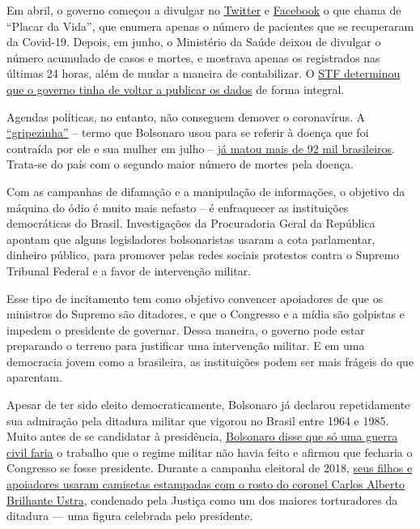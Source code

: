 Em abril, o governo começou a divulgar no
\href{https://twitter.com/secomvc/status/1257836970518200323}{Twitter} e
\href{https://www.facebook.com/minsaude/posts/3549590468392877}{Facebook}
o que chama de ``Placar da Vida'', que enumera apenas o número de
pacientes que se recuperaram da Covid-19. Depois, em junho, o Ministério
da Saúde deixou de divulgar o número acumulado de casos e mortes, e
mostrava apenas os registrados nas últimas 24 horas, além de mudar a
maneira de contabilizar. O
\href{https://www.nytimes.com/2020/06/19/world/coronavirus-live-updates.html}{STF
determinou que o governo tinha de voltar a publicar os dados} de forma
integral.

Agendas políticas, no entanto, não conseguem demover o coronavírus. A
\href{https://www.cnn.com/2020/05/23/americas/brazil-coronavirus-hospitals-intl/index.html}{``gripezinha''}
-- termo que Bolsonaro usou para se referir à doença que foi contraída
por ele e sua mulher em julho --
\href{https://www.nytimes.com/interactive/2020/world/americas/brazil-coronavirus-cases.html}{já
matou mais de 92 mil brasileiros}. Trata-se do país com o segundo maior
número de mortes pela doença.

Com as campanhas de difamação e a manipulação de informações, o objetivo
da máquina do ódio é muito mais nefasto -- é enfraquecer as instituições
democráticas do Brasil. Investigações da Procuradoria Geral da República
apontam que alguns legisladores bolsonaristas usaram a cota parlamentar,
dinheiro público, para promover pelas redes sociais protestos contra o
Supremo Tribunal Federal e a favor de intervenção militar.

Esse tipo de incitamento tem como objetivo convencer apoiadores de que
os ministros do Supremo são ditadores, e que o Congresso e a mídia são
golpistas e impedem o presidente de governar. Dessa maneira, o governo
pode estar preparando o terreno para justificar uma intervenção militar.
E em uma democracia jovem como a brasileira, as instituições podem ser
mais frágeis do que aparentam.

Apesar de ter sido eleito democraticamente, Bolsonaro já declarou
repetidamente sua admiração pela ditadura militar que vigorou no Brasil
entre 1964 e 1985. Muito antes de se candidatar à presidência,
\href{https://www.youtube.com/watch?v=qIDyw9QKIvw\&t=577s}{Bolsonaro
disse que só uma guerra civil faria} o trabalho que o regime militar não
havia feito e afirmou que fecharia o Congresso se fosse presidente.
Durante a campanha eleitoral de 2018,
\href{https://congressoemfoco.uol.com.br/especial/noticias/fas-usam-imagem-de-torturador-para-promover-bolsonaro/}{seus
filhos e apoiadores usaram camisetas estampadas com o rosto do coronel
Carlos Alberto Brilhante Ustra}, condenado pela Justiça como um dos
maiores torturadores da ditadura --- uma figura celebrada pelo
presidente.

